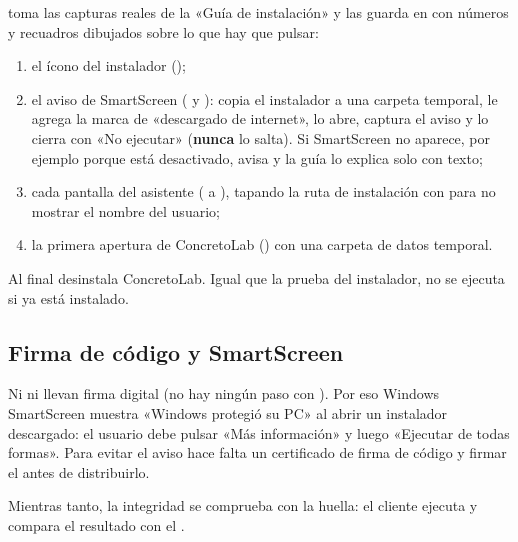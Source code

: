  toma las capturas
reales de la «Guía de instalación» y las guarda en 
con números y recuadros dibujados sobre lo que hay que pulsar:

\begin{enumerate}
	\item el ícono del instalador ();
	\item el aviso de SmartScreen ( y ): copia el instalador a una carpeta temporal, le agrega la marca
	       de «descargado de internet», lo abre, captura el aviso y lo cierra con «No ejecutar»
	      (\textbf{nunca} lo salta). Si SmartScreen no aparece, por ejemplo porque está desactivado, avisa y la guía lo
	      explica solo con texto;
	\item cada pantalla del asistente ( a ), tapando la ruta de instalación con
	       para no mostrar el nombre del
	      usuario;
	\item la primera apertura de ConcretoLab () con una carpeta de datos temporal.
\end{enumerate}

Al final desinstala ConcretoLab. Igual que la prueba del instalador, no se ejecuta si ya está instalado.

\subsection{Firma de código y SmartScreen}

\begin{advertencia}
Ni  ni  llevan firma digital (no hay ningún paso con
). Por eso Windows SmartScreen muestra «Windows protegió su PC» al abrir un instalador descargado: el
usuario debe pulsar «Más información» y luego «Ejecutar de todas formas». Para evitar el aviso hace falta un
certificado de firma de código y firmar el  antes de distribuirlo.
\end{advertencia}

Mientras tanto, la integridad se comprueba con la huella: el cliente ejecuta
 y compara el resultado con el
.

